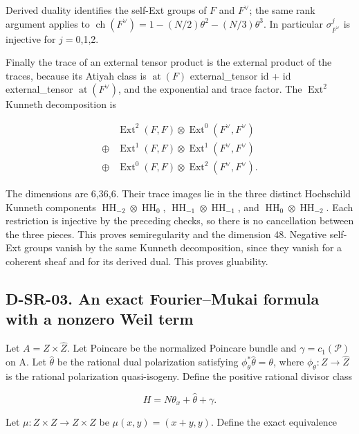Derived duality identifies the self-Ext groups of \(F\) and \(F^\vee\); the same rank argument applies to \(\operatorname{ch}(F^\vee)=1-(N/2)\theta^2-(N/3)\theta^3\). In particular \(\sigma_{F^\vee}^j\) is injective for \(j= 0\),1,2.

Finally the trace of an external tensor product is the external product of the traces, because its Atiyah class is \(\operatorname{at}(F)\) external\_tensor id + id external\_tensor \(\operatorname{at}(F^\vee)\), and the exponential and trace factor. The \(\operatorname{Ext}^2\) Kunneth decomposition is

\[
\begin{aligned}&\operatorname{Ext}^2(F,F)\otimes\operatorname{Ext}^0(F^\vee,F^\vee)\\{}\oplus{}&\operatorname{Ext}^1(F,F)\otimes\operatorname{Ext}^1(F^\vee,F^\vee)\\{}\oplus{}&\operatorname{Ext}^0(F,F)\otimes\operatorname{Ext}^2(F^\vee,F^\vee).\end{aligned}
\]

The dimensions are 6,36,6. Their trace images lie in the three distinct Hochschild Kunneth components \(\operatorname{HH}_{-2}\otimes\operatorname{HH}_0\), \(\operatorname{HH}_{-1}\otimes\operatorname{HH}_{-1}\), and \(\operatorname{HH}_0\otimes\operatorname{HH}_{-2}\). Each restriction is injective by the preceding checks, so there is no cancellation between the three pieces. This proves semiregularity and the dimension 48. Negative self-Ext groups vanish by the same Kunneth decomposition, since they vanish for a coherent sheaf and for its derived dual. This proves gluability.

\subsection{D-SR-03. An exact Fourier--Mukai formula with a nonzero Weil term}
\label{D-SR-03}

Let \(A=Z\times\widehat Z\). Let Poincare be the normalized Poincare bundle and \(\gamma=c_1(\mathcal P)\) on A. Let \(\widehat\theta\) be the rational dual polarization satisfying \(\phi_\theta^*\widehat\theta=\theta\), where \(\phi_\theta:Z\to\widehat Z\) is the rational polarization quasi-isogeny. Define the positive rational divisor class

\[
H=N\theta_x+\widehat\theta+\gamma.\tag{SR3.1}
\]

Let \(\mu:Z\times Z\to Z\times Z\) be \(\mu(x,y)=(x+y,y)\). Define the exact equivalence

